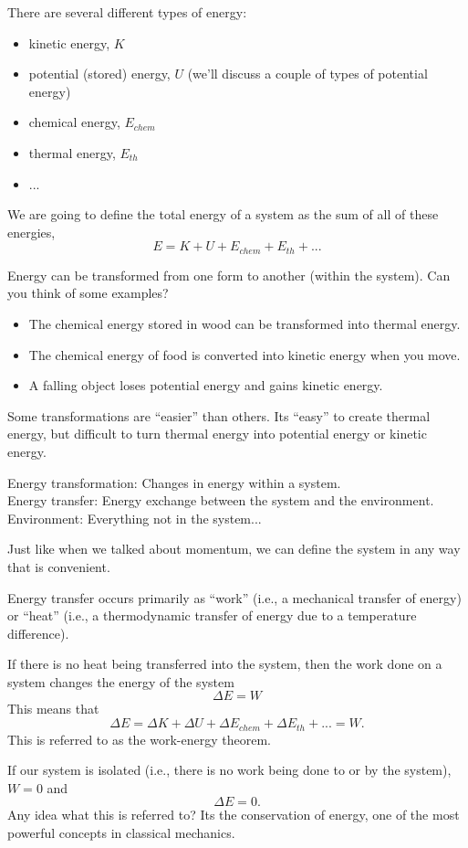 There are several different types of energy:
\begin{itemize}
\item kinetic energy, $K$
\item potential (stored) energy, $U$ (we'll discuss a couple of types of potential energy)
\item chemical energy, $E_{chem}$
\item thermal energy, $E_{th}$
\item ...
\end{itemize}

We are going to define the total energy of a system as the sum of all of these energies,
$$E=K+U+E_{chem}+E_{th}+...$$

Energy can be transformed from one form to another (within the system). Can you think of some examples?
\begin{itemize}
\item The chemical energy stored in wood can be transformed into thermal energy.
\item The chemical energy of food is converted into kinetic energy when you move.
\item A falling object loses potential energy and gains kinetic energy.
\end{itemize}

Some transformations are ``easier'' than others. Its ``easy'' to create thermal energy, but difficult to turn thermal energy into potential energy or kinetic energy.

Energy transformation: Changes in energy within a system.\\
Energy transfer: Energy exchange between the system and the environment.\\
Environment: Everything not in the system...

Just like when we talked about momentum, we can define the system in any way that is convenient.

Energy transfer occurs primarily as ``work'' (i.e., a mechanical transfer of energy) or ``heat'' (i.e., a thermodynamic transfer of energy due to a temperature difference).

If there is no heat being transferred into the system, then the work done on a system changes the energy of the system
$$\Delta E=W$$
This means that
$$\Delta{E}=\Delta{K}+\Delta{U}+\Delta{E_{chem}}+\Delta{E_{th}}+...=W.$$
This is referred to as the work-energy theorem.

If our system is isolated (i.e., there is no work being done to or by the system), $W=0$ and 
$$\Delta{E}=0.$$
Any idea what this is referred to? Its the conservation of energy, one of the most powerful concepts in classical mechanics.

